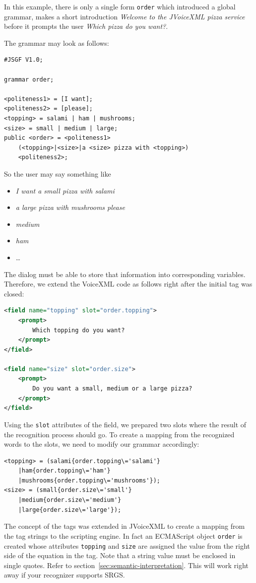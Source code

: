 \documentclass[11pt,a4paper]{article}
\begin{document}
In this example, there is only a single form \lstinline{order} which introduced
a global grammar, makes a short introduction \emph{Welcome to the JVoiceXML
pizza service} before it prompts the user \emph{Which pizza do you want?}.

The grammar may look as follows:
\begin{lstlisting}
#JSGF V1.0; 

grammar order;

<politeness1> = [I want];
<politeness2> = [please];
<topping> = salami | ham | mushrooms;
<size> = small | medium | large;
public <order> = <politeness1>
    (<topping>|<size>|a <size> pizza with <topping>)
    <politeness2>;
\end{lstlisting}

So the user may say something like
\begin{itemize}
  \item \emph{I want a small pizza with salami}
  \item \emph{a large pizza with mushrooms please}
  \item \emph{medium}
  \item \emph{ham}
  \item \ldots
\end{itemize}

The dialog must be able to store that information into corresponding variables.
Therefore, we extend the VoiceXML code as follows right after the initial tag
was closed:
\begin{lstlisting}[language=XML]
<field name="topping" slot="order.topping">
    <prompt>
        Which topping do you want?
    </prompt>
</field>

<field name="size" slot="order.size">
    <prompt>
        Do you want a small, medium or a large pizza?
    </prompt>
</field>
\end{lstlisting}

Using the \lstinline{slot} attributes of the field, we prepared two slots where
the result of the recognition process should go.
To create a mapping from the recognized words to the slots, we need to modify
our grammar accordingly:
\begin{lstlisting}
<topping> = (salami{order.topping\='salami'}
    |ham{order.topping\='ham'}
    |mushrooms{order.topping\='mushrooms'});
<size> = (small{order.size\='small'}
    |medium{order.size\='medium'}
    |large{order.size\='large'});
\end{lstlisting}
The concept of the tags was extended in JVoiceXML to create a mapping from the
tag strings to the scripting engine. In fact an ECMAScript object
\lstinline{order} is created whose attributes \lstinline{topping} and
\lstinline{size} are assigned the value from the right side of the equation in
the tag. Note that a string value must be enclosed in single quotes. Refer
to section~\ref{sec:semantic-interpretation}. This will work right away if your
recognizer supports SRGS.
\end{document}
